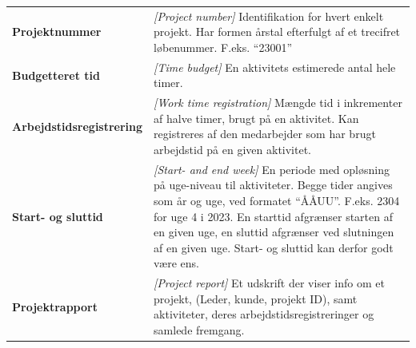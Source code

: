 \begin{table}[H]
\begin{tabular}{>{\bfseries}l p{}}
        Projektnummer           & \textit{[Project number]} Identifikation for hvert enkelt projekt. Har formen årstal efterfulgt af et trecifret løbenummer. F.eks. ``23001''                                                                                                                                                                                   \\
        Budgetteret tid         & \textit{[Time budget]} En aktivitets estimerede antal hele timer.                                                                                                                                                                                                                                                              \\
        Arbejdstidsregistrering & \textit{[Work time registration]} Mængde tid i inkrementer af halve timer, brugt på en aktivitet. Kan registreres af den medarbejder som har brugt arbejdstid på en given aktivitet.                                                                                                                                           \\
        Start- og sluttid       & \textit{[Start- and end week]} En periode med opløsning på uge-niveau til aktiviteter. Begge tider angives som år og uge, ved formatet ``ÅÅUU''. F.eks. 2304 for uge 4 i 2023. En starttid afgrænser starten af en given uge, en sluttid afgrænser ved slutningen af en given uge. Start- og sluttid kan derfor godt være ens. \\
        Projektrapport          & \textit{[Project report]} Et udskrift der viser info om et projekt, (Leder, kunde, projekt ID), samt aktiviteter, deres arbejdstidsregistreringer og samlede fremgang.
    \end{tabular}
\end{table}\newpage
